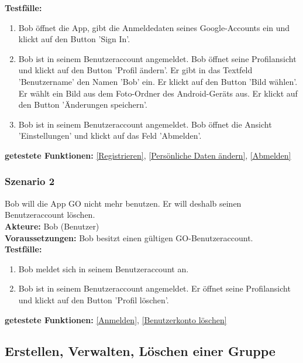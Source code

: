 \documentclass[parskip=full]{scrartcl}
\def\threedigits#1{%
  \ifnum#1<100 0\fi
  \ifnum#1<10 0\fi
  \number#1}
\begin{document}
\textbf{Testfälle:}
\begin{enumerate}[label={\textbf{/T\protect\threedigits{\theenumi}0/}}, leftmargin=*]
	\item\label{Registrieren-Test} Bob öffnet die App, gibt die Anmeldedaten seines Google-Accounts ein und klickt auf den Button 'Sign In'.
	\item Bob ist in seinem Benutzeraccount angemeldet. Bob öffnet seine Profilansicht und klickt auf den Button 'Profil ändern'. Er gibt in das Textfeld 'Benutzername' den Namen 'Bob' ein. Er klickt auf den Button 'Bild wählen'. Er wählt ein Bild aus dem Foto-Ordner des Android-Geräts aus. Er klickt auf den Button 'Änderungen speichern'.
	\item Bob ist in seinem Benutzeraccount angemeldet. Bob öffnet die Ansicht 'Einstellungen' und klickt auf das Feld 'Abmelden'.
\end{enumerate}

\textbf{getestete Funktionen: }\ref{Registrieren}, \ref{Persönliche Daten ändern}, \ref{Abmelden}

\subsubsection*{Szenario 2}Bob will die App GO nicht mehr benutzen. Er will deshalb seinen Benutzeraccount löschen. \\

\textbf{Akteure:} Bob (Benutzer) \\

\textbf{Voraussetzungen: }Bob besitzt einen gültigen GO-Benutzeraccount.\\

\textbf{Testfälle:}
\begin{enumerate}[label={\textbf{/T\protect\threedigits{\theenumi}0/}}, leftmargin=*, resume]
	\item Bob meldet sich in seinem Benutzeraccount an. 
	\item Bob ist in seinem Benutzeraccount angemeldet. Er öffnet seine Profilansicht und klickt auf den Button 'Profil löschen'.
\end{enumerate}

\textbf{getestete Funktionen: }\ref{Anmelden}, \ref{Benutzerkonto löschen}

\subsection{Erstellen, Verwalten, Löschen einer Gruppe}
\end{document}
